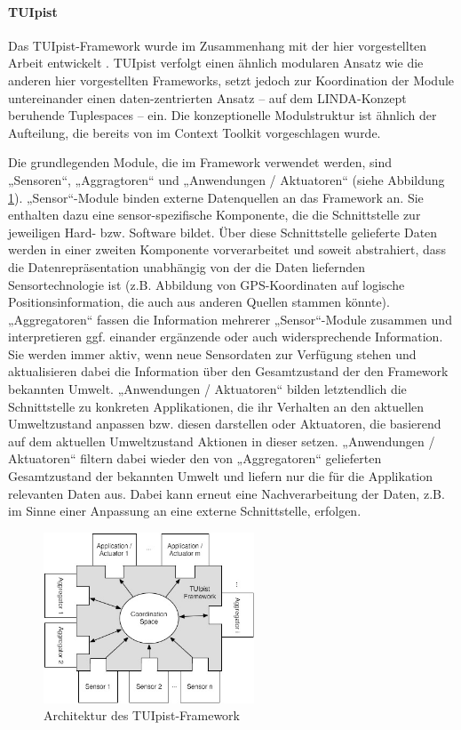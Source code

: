 \paragraph{TUIpist} %
\label{par:tuipist}

Das TUIpist-Framework \citep{Furtmuller07} wurde im Zusammenhang mit der hier vorgestellten Arbeit entwickelt \citep{Furtmuller07a}. TUIpist verfolgt einen ähnlich modularen Ansatz wie die anderen hier vorgestellten Frameworks, setzt jedoch zur Koordination der Module untereinander einen daten-zentrierten Ansatz -- auf dem LINDA-Konzept \citep{Carriero89} beruhende Tuplespaces -- ein. Die konzeptionelle Modulstruktur ist ähnlich der Aufteilung, die bereits von \citet{Dey01} im Context Toolkit vorgeschlagen wurde.

Die grundlegenden Module, die im Framework verwendet werden, sind „Sensoren“, „Aggragtoren“ und „Anwendungen / Aktuatoren“ (siehe Abbildung \ref{fig:img_ImplementierungInput_TUIpist}). „Sensor“-Module binden externe Datenquellen an das Framework an. Sie enthalten dazu eine sensor-spezifische Komponente, die die Schnittstelle zur jeweiligen Hard- bzw. Software bildet. Über diese Schnittstelle gelieferte Daten werden in einer zweiten Komponente vorverarbeitet und soweit abstrahiert, dass die Datenrepräsentation unabhängig von der die Daten liefernden Sensortechnologie ist (z.B. Abbildung von \gls{GPS}-Koordinaten auf logische Positionsinformation, die auch aus anderen Quellen stammen könnte). „Aggregatoren“ fassen die Information mehrerer „Sensor“-Module zusammen und interpretieren ggf. einander ergänzende oder auch widersprechende Information. Sie werden immer aktiv, wenn neue Sensordaten zur Verfügung stehen und aktualisieren dabei die Information über den Gesamtzustand der den Framework bekannten Umwelt. „Anwendungen / Aktuatoren“ bilden letztendlich die Schnittstelle zu konkreten Applikationen, die ihr Verhalten an den aktuellen Umweltzustand anpassen bzw. diesen darstellen oder Aktuatoren, die basierend auf dem aktuellen Umweltzustand Aktionen in dieser setzen. „Anwendungen / Aktuatoren“ filtern dabei wieder den von „Aggregatoren“ gelieferten Gesamtzustand der bekannten Umwelt und liefern nur die für die Applikation relevanten Daten aus. Dabei kann erneut eine Nachverarbeitung der Daten, z.B. im Sinne einer Anpassung an eine externe Schnittstelle, erfolgen.

\begin{figure}[htbp]
	\centering
		\includegraphics[height=2in]{img/ImplementierungInput/TUIpistArchitecture.jpg}
	\caption[Architektur des TUIpist-Framework]{Architektur des TUIpist-Framework \citep{Furtmuller07a}}
	\label{fig:img_ImplementierungInput_TUIpist}
\end{figure}

